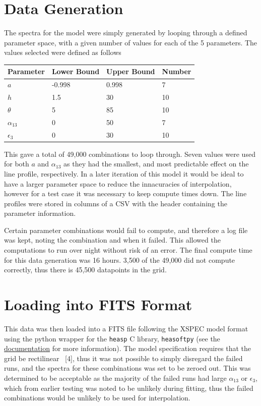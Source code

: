 \documentclass[
  letterpaper,
  DIV=11,
  numbers=noendperiod]{scrreprt}
\newcounter{none} %
\begin{document}
\section{Data Generation}\label{data-generation}

The spectra for the model were simply generated by looping through a
defined parameter space, with a given number of values for each of the 5
parameters. The values selected were defined as follows

{\def\LTcaptype{none} %
\begin{longtable}[]{@{}llll@{}}
\toprule\noalign{}
Parameter & Lower Bound & Upper Bound & Number \\
\midrule\noalign{}
\endhead
\bottomrule\noalign{}
\endlastfoot
\(a\) & -0.998 & 0.998 & 7 \\
\(h\) & 1.5 & 30 & 10 \\
\(\theta\) & 5 & 85 & 10 \\
\(\alpha_{13}\) & 0 & 50 & 7 \\
\(\epsilon_3\) & 0 & 30 & 10 \\
\end{longtable}
}

This gave a total of 49,000 combinations to loop through. Seven values
were used for both \(a\) and \(\alpha_{13}\) as they had the smallest,
and most predictable effect on the line profile, respectively. In a
later iteration of this model it would be ideal to have a larger
parameter space to reduce the innacuracies of interpolation, however for
a test case it was necessary to keep compute times down. The line
profiles were stored in columns of a CSV with the header containing the
parameter information.

Certain parameter combinations would fail to compute, and therefore a
log file was kept, noting the combination and when it failed. This
allowed the computations to run over night without risk of an error. The
final compute time for this data generation was 16 hours. 3,500 of the
49,000 did not compute correctly, thus there is 45,500 datapoints in the
grid.

\section{Loading into FITS Format}\label{loading-into-fits-format}

This data was then loaded into a FITS file following the XSPEC model
format using the python wrapper for the \texttt{heasp} C library,
\texttt{heasoftpy} (see the
\href{https://heasarc.gsfc.nasa.gov/docs/software/lheasoft/headas/heasp/node2.html}{documentation}
for more information). The model specification requires that the grid be
rectilinear ~{[}4{]}, thus it was not possible to simply disregard the
failed runs, and the spectra for these combinations was set to be zeroed
out. This was determined to be acceptable as the majority of the failed
runs had large \(\alpha_{13}\) or \(\epsilon_3\), which from earlier
testing was noted to be unlikely during fitting, thus the failed
combinations would be unlikely to be used for interpolation.
\end{document}
